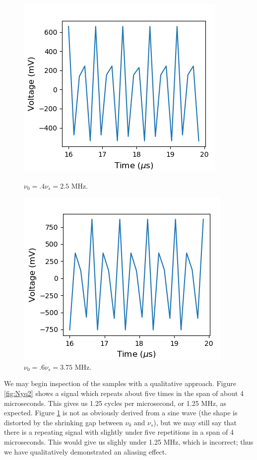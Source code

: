 \documentclass[a4paper]{article}
\begin{document}
\begin{figure}
\centering
\begin{minipage}{.5\textwidth}
	\centering
	\includegraphics[width=.8\linewidth]{5-2_trial4}
	\caption{$\nu_0 = .4 \nu_s = 2.5$ MHz.}
	\label{fig:Nyq4}
\end{minipage}%
\begin{minipage}{.5\textwidth}
	\centering
	\includegraphics[width=.8\linewidth]{5-2_trial6}
	\caption{$\nu_0 = .6 \nu_s = 3.75$ MHz.}
	\label{fig:Nyq6}
\end{minipage}
\end{figure}
	
\quad We may begin inspection of the samples with a qualitative approach. Figure \ref{fig:Nyq2} shows a signal which repeats about five times in the span of about 4 microseconds. This gives us 1.25 cycles per microsecond, or 1.25 MHz, as expected. Figure \ref{fig:Nyq6} is not as obviously derived from a sine wave (the shape is distorted by the shrinking gap between $\nu_0$ and $\nu_s$), but we may still say that there is a repeating signal with slightly under five repetitions in a span of 4 microseconds. This would give us slighly under 1.25 MHz, which is incorrect; thus we have qualitatively demonstrated an aliasing effect.
\end{document}
